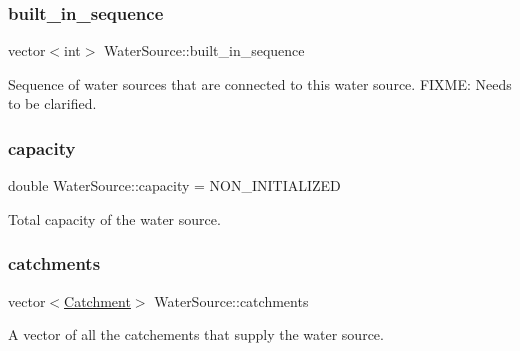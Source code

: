 \mbox{\label{classWaterSource_a49f9da70a5080abe82160b1a0d194e60}} 
\subsubsection{\texorpdfstring{built\+\_\+in\+\_\+sequence}{built\_in\_sequence}}
{\footnotesize\ttfamily vector$<$int$>$ Water\+Source\+::built\+\_\+in\+\_\+sequence\hspace{0.3cm}{\ttfamily [protected]}}



Sequence of water sources that are connected to this water source. F\+I\+X\+ME\+: Needs to be clarified. 

\mbox{\label{classWaterSource_a2ec257b415b248214a8bce7fc5267723}} 
\subsubsection{\texorpdfstring{capacity}{capacity}}
{\footnotesize\ttfamily double Water\+Source\+::capacity = N\+O\+N\+\_\+\+I\+N\+I\+T\+I\+A\+L\+I\+Z\+ED\hspace{0.3cm}{\ttfamily [protected]}}



Total capacity of the water source. 

\mbox{\label{classWaterSource_a8c18c34f23f8a06685c1d12f462ed830}} 
\subsubsection{\texorpdfstring{catchments}{catchments}}
{\footnotesize\ttfamily vector$<$\mbox{\hyperlink{classCatchment}{Catchment}}$>$ Water\+Source\+::catchments\hspace{0.3cm}{\ttfamily [protected]}}



A vector of all the catchements that supply the water source. 

